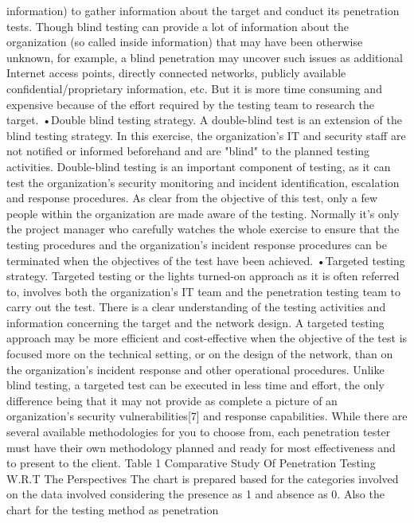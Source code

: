 information) to gather information about the target and 
conduct its penetration tests. Though blind testing can 
provide a lot of information about the organization (so 
called inside information) that may have been otherwise 
unknown, for example, a blind penetration may uncover 
such issues as additional Internet access points, directly 
connected networks, publicly available 
confidential/proprietary information, etc. But it is more 
time consuming and expensive because of the effort 
required by the testing team to research the target. 
•Double blind testing strategy. A double-blind test is an 
extension of the blind testing strategy. In this exercise, the 
organization's IT and security staff are not notified or 
informed beforehand and are "blind" to the planned testing 
activities. Double-blind testing is an important component 
of testing, as it can test the organization's security 
monitoring and incident identification, escalation and 
response procedures. As clear  from the objective of this 
test, only a few people within the organization are made 
aware of the testing. Normally it's only the project manager 
who carefully watches the whole exercise to ensure that the 
testing procedures and the organization's incident response 
procedures can be terminated when the objectives of the 
test have been achieved. 
•Targeted testing strategy. Targeted testing or the lights
turned-on approach as it is often referred to, involves both 
the organization's IT team and the penetration testing team 
to carry out the test. There is a clear understanding of the 
testing activities and information concerning the target and 
the network design. A targeted testing approach may be 
more efficient and cost-effective when the objective of the 
test is focused more on the technical setting, or on the 
design of the network, than on the organization's incident 
response and other operational procedures. Unlike blind 
testing, a targeted test can be executed in less time and 
effort, the only difference being that it may not provide as 
complete a picture of an organization's security 
vulnerabilities[7] and response capabilities. While there are 
several available methodologies for you to choose from, 
each penetration tester must have their own methodology 
planned and ready for most effectiveness and to present to 
the client. 
Table 1 
Comparative Study Of Penetration Testing W.R.T The 
Perspectives 
The chart is prepared based for the categories involved on 
the data involved considering the presence as 1 and absence 
as 0. Also the chart for the testing method as penetration 
